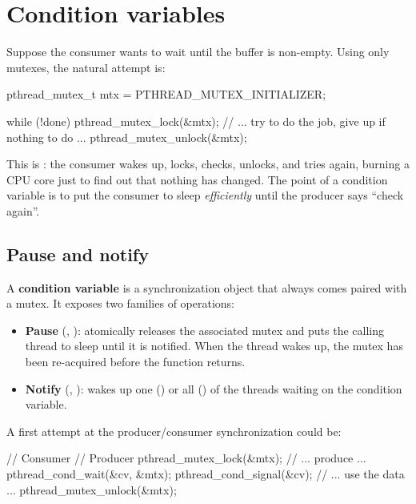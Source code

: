 \section{Condition variables}

Suppose the consumer wants to wait until the buffer is non-empty. Using only mutexes, the natural attempt is:

\begin{codeblock}[language=C]
pthread_mutex_t mtx = PTHREAD_MUTEX_INITIALIZER;

while (!done) {
    pthread_mutex_lock(&mtx);
    // ... try to do the job, give up if nothing to do ...
    pthread_mutex_unlock(&mtx);
}
\end{codeblock}

This is : the consumer wakes up, locks, checks, unlocks, and tries again, burning a CPU core just to find out that nothing has changed. The point of a condition variable is to put the consumer to sleep \emph{efficiently} until the producer says ``check again''.

\subsection{Pause and notify}

A \textbf{condition variable} is a synchronization object that always comes paired with a mutex. It exposes two families of operations:

\begin{itemize}[noitemsep]
    \item \textbf{Pause} (, ): atomically releases the associated mutex and puts the calling thread to sleep until it is notified. When the thread wakes up, the mutex has been re-acquired before the function returns.
    \item \textbf{Notify} (, ): wakes up one () or all () of the threads waiting on the condition variable.
\end{itemize}

A first attempt at the producer/consumer synchronization could be:

\begin{codeblock}[language=C]
// Consumer                                   // Producer
pthread_mutex_lock(&mtx);
                                              // ... produce ...
pthread_cond_wait(&cv, &mtx);                 pthread_cond_signal(&cv);
// ... use the data ...
pthread_mutex_unlock(&mtx);
\end{codeblock}

